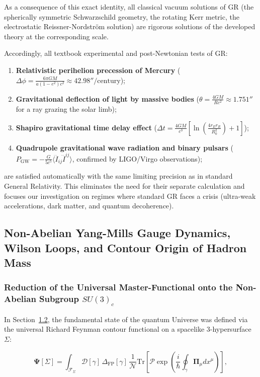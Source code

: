 \documentclass[11pt,a4paper]{article}
\theoremstyle{definition}
\begin{document}
As a consequence of this exact identity, all classical vacuum solutions of GR (the spherically symmetric Schwarzschild geometry, the rotating Kerr metric, the electrostatic Reissner-Nordstr\"om solution) are rigorous solutions of the developed theory at the corresponding scale.

Accordingly, all textbook experimental and post-Newtonian tests of GR:
\begin{enumerate}
\item \textbf{Relativistic perihelion precession of Mercury} ($\Delta\phi = \frac{6\pi GM}{a(1-e^2)c^2} \approx 42.98''/\text{century}$);
\item \textbf{Gravitational deflection of light by massive bodies} ($\theta = \frac{4GM}{R c^2} \approx 1.751''$ for a ray grazing the solar limb);
\item \textbf{Shapiro gravitational time delay effect} ($\Delta t = \frac{4GM}{c^3} \left[ \ln\left(\frac{4 r_E r_R}{R_0^2}\right) + 1 \right]$);
\item \textbf{Quadrupole gravitational wave radiation and binary pulsars} ($P_{\text{GW}} = -\frac{G}{5 c^5} \langle \dddot{I}_{ij} \dddot{I}^{ij} \rangle$, confirmed by LIGO/Virgo observations);
\end{enumerate}
are satisfied automatically with the same limiting precision as in standard General Relativity. This eliminates the need for their separate calculation and focuses our investigation on regimes where standard GR faces a crisis (ultra-weak accelerations, dark matter, and quantum decoherence).

\subsection{Non-Abelian Yang-Mills Gauge Dynamics, Wilson Loops, and Contour Origin of Hadron Mass}\label{sec:2.3}

\subsubsection{Reduction of the Universal Master-Functional onto the Non-Abelian Subgroup $SU(3)_c$}\label{sec:2.3.1}

In Section~\hyperref[sec:1.2]{1.2}, the fundamental state of the quantum Universe was defined via the universal Richard Feynman contour functional on a spacelike 3-hypersurface $\Sigma$:

\begin{equation}\label{eq:2.3.1}\tag{2.3.1}
\mathbf{\Psi}[\Sigma] = \int_{\mathcal{F}_\Sigma} \mathcal{D}[\gamma] \, \Delta_{\text{FP}}[\gamma] \, \frac{1}{\mathcal{N}} \text{Tr}\left[ \mathcal{P}\exp\left( \frac{i}{\hbar} \oint_{\gamma} \mathbf{\Pi}_\mu dx^\mu \right) \right],
\end{equation}
\end{document}
